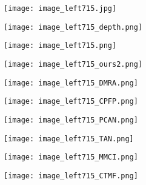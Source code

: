\documentclass[runningheads]{llncs}
\begin{document}
\begin{figure}[t]
	\begin{subfigure}[t]{1.13cm}
		\centering
		\texttt{[image: image\_left715.jpg]}
	\end{subfigure}
	\begin{subfigure}[t]{1.13cm}
		\centering
		\texttt{[image: image\_left715\_depth.png]}
	\end{subfigure}
	\begin{subfigure}[t]{1.13cm}
		\centering
		\texttt{[image: image\_left715.png]}
	\end{subfigure}
	\begin{subfigure}[t]{1.13cm}
		\centering
		\texttt{[image: image\_left715\_ours2.png]}
	\end{subfigure}
	\begin{subfigure}[t]{1.13cm}
		\centering
		\texttt{[image: image\_left715\_DMRA.png]}
	\end{subfigure}
	\begin{subfigure}[t]{1.13cm}
		\centering
		\texttt{[image: image\_left715\_CPFP.png]}
	\end{subfigure}
	\begin{subfigure}[t]{1.13cm}
		\centering
		\texttt{[image: image\_left715\_PCAN.png]}
	\end{subfigure}
	\begin{subfigure}[t]{1.13cm}
		\centering
		\texttt{[image: image\_left715\_TAN.png]}
	\end{subfigure}
	\begin{subfigure}[t]{1.13cm}
		\centering
		\texttt{[image: image\_left715\_MMCI.png]}
	\end{subfigure}
	\begin{subfigure}[t]{1.13cm}
		\centering
		\texttt{[image: image\_left715\_CTMF.png]}
	\end{subfigure}
	
	\vspace{1pt}
	

\end{figure}
\end{document}
